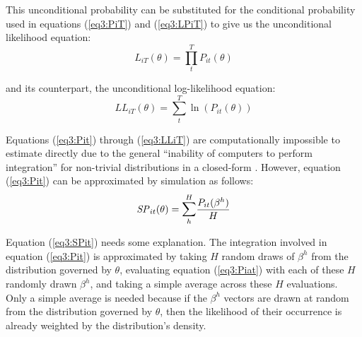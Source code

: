 \documentclass[../main.tex]{subfiles}
\begin{document}
\addtocounter{footnote}{-2}

This unconditional probability can be substituted for the conditional probability used in equations (\ref{eq3:PiT}) and (\ref{eq3:LPiT}) to give us the unconditional likelihood equation:
\begin{equation}
	\label{eq3:LiT}
	L_{iT}(\theta) = \prod_t^T P_{it}(\theta)
\end{equation}

\noindent and its counterpart, the unconditional log-likelihood equation:
\begin{equation}
	\label{eq3:LLiT}
	\mathit{LL}_{iT}(\theta) = \sum_t^T \ln \left( P_{it}(\theta) \right)
\end{equation}

Equations (\ref{eq3:Pit}) through (\ref{eq3:LLiT}) are computationally impossible to estimate directly due to the general \enquote{inability of computers to perform integration} for non-trivial distributions in a closed-form \parencite[2]{Train2002}.
However, equation (\ref{eq3:Pit}) can be approximated by simulation as follows:
\begin{equation}
	\label{eq3:SPit}
	\mathit{SP}_{it}(\theta) = \mathlarger{\sum}_h^H \frac{ P_{it}(\beta^h) }{H}
\end{equation}

Equation (\ref{eq3:SPit}) needs some explanation.
The integration involved in equation (\ref{eq3:Pit}) is approximated by taking $H$ random draws of $\beta^h$ from the distribution governed by $\theta$, evaluating equation (\ref{eq3:Piat}) with each of these $H$ randomly drawn $\beta^h$, and taking a simple average across these $H$ evaluations.
Only a simple average is needed because if the $\beta^h$ vectors are drawn at random from the distribution governed by $\theta$, then the likelihood of their occurrence is already weighted by the distribution's density.
\end{document}
